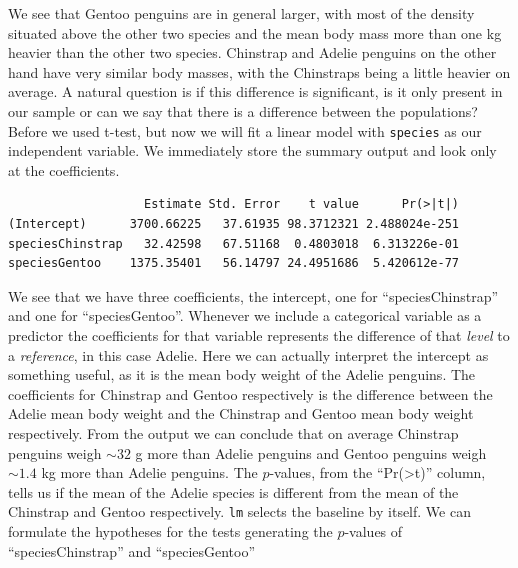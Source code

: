 \documentclass[
  letterpaper,
  DIV=11,
  numbers=noendperiod]{scrreprt}
\newenvironment{Shaded}{\begin{snugshade}}{\end{snugshade}}
\newcommand{\AttributeTok}[1]{\textcolor[rgb]{0.40,0.45,0.13}{#1}}
\newcommand{\FunctionTok}[1]{\textcolor[rgb]{0.28,0.35,0.67}{#1}}
\newcommand{\NormalTok}[1]{\textcolor[rgb]{0.00,0.23,0.31}{#1}}
\newcommand{\OtherTok}[1]{\textcolor[rgb]{0.00,0.23,0.31}{#1}}
\newcommand{\SpecialCharTok}[1]{\textcolor[rgb]{0.37,0.37,0.37}{#1}}
\begin{document}
We see that Gentoo penguins are in general larger, with most of the
density situated above the other two species and the mean body mass more
than one kg heavier than the other two species. Chinstrap and Adelie
penguins on the other hand have very similar body masses, with the
Chinstraps being a little heavier on average. A natural question is if
this difference is significant, is it only present in our sample or can
we say that there is a difference between the populations? Before we
used t-test, but now we will fit a linear model with \texttt{species} as
our independent variable. We immediately store the summary output and
look only at the coefficients.

\begin{Shaded}
\end{Shaded}

\begin{verbatim}
                   Estimate Std. Error    t value      Pr(>|t|)
(Intercept)      3700.66225   37.61935 98.3712321 2.488024e-251
speciesChinstrap   32.42598   67.51168  0.4803018  6.313226e-01
speciesGentoo    1375.35401   56.14797 24.4951686  5.420612e-77
\end{verbatim}

We see that we have three coefficients, the intercept, one for
``speciesChinstrap'' and one for ``speciesGentoo''. Whenever we include
a categorical variable as a predictor the coefficients for that variable
represents the difference of that \emph{level} to a \emph{reference}, in
this case Adelie. Here we can actually interpret the intercept as
something useful, as it is the mean body weight of the Adelie penguins.
The coefficients for Chinstrap and Gentoo respectively is the difference
between the Adelie mean body weight and the Chinstrap and Gentoo mean
body weight respectively. From the output we can conclude that on
average Chinstrap penguins weigh \(\sim 32\) g more than Adelie penguins
and Gentoo penguins weigh \(\sim 1.4\) kg more than Adelie penguins. The
\(p\)-values, from the ``Pr(\textgreater\textbar t\textbar)'' column,
tells us if the mean of the Adelie species is different from the mean of
the Chinstrap and Gentoo respectively. \texttt{lm} selects the baseline
by itself. We can formulate the hypotheses for the tests generating the
\(p\)-values of ``speciesChinstrap'' and ``speciesGentoo''
\end{document}
